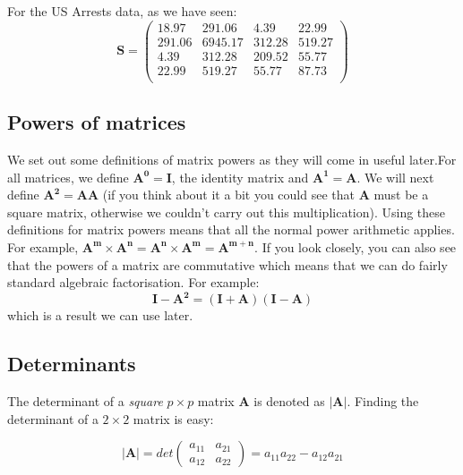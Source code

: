 For the US Arrests data, as we have seen:
\begin{displaymath}
\boldsymbol{S} = 
\left( 
\begin{array}{rrrr}
18.97 & 291.06 & 4.39 & 22.99 \\
291.06 & 6945.17 & 312.28 & 519.27 \\
4.39 & 312.28 & 209.52 & 55.77 \\
22.99 & 519.27 & 55.77 & 87.73 \\
\end{array} 
\right)
\end{displaymath}





\subsection{Powers of matrices}

We set out some definitions of matrix powers as they will come in useful later.For all matrices, we define $\mathbf{A^0} = \mathbf{I}$, the identity matrix and $\mathbf{A^1} = \mathbf{A}$.  We will next define $\mathbf{A^2} = \mathbf{AA}$ (if you think about it a bit you could see that $\mathbf{A}$ must be a square matrix, otherwise we couldn't carry out this multiplication).   Using these definitions for matrix powers means that all the normal power arithmetic applies.   For example, $\mathbf{A^m} \times \mathbf{A^n} =  \mathbf{A^n} \times \mathbf{A^m} = \mathbf{A^{m+n}}$.   If you look closely, you can also see that the powers of a matrix are commutative which means that we can do fairly standard algebraic factorisation.   For example:
\begin{displaymath}
\mathbf{I} - \mathbf{A^2} = (\mathbf{I} + \mathbf{A})(\mathbf{I} - \mathbf{A})
\end{displaymath} 
which is a result we can use later.




\subsection{Determinants}

The determinant of a \emph{square} $p\times p$ matrix \textbf{A} is denoted as $\lvert \boldsymbol{A} \rvert$.   Finding the determinant of a $2 \times 2$ matrix is easy:

\begin{displaymath}
\lvert \boldsymbol{A} \rvert = det \left(\begin{array}{rr} a_{11} & a_{21} \\ a_{12} & a_{22} \end{array} \right) = a_{11} a_{22} - a_{12} a_{21}
\end{displaymath}


